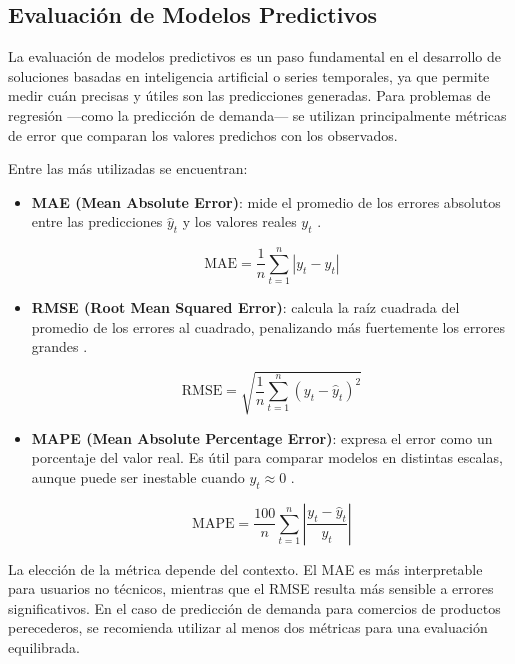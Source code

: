 \subsection{Evaluación de Modelos Predictivos}

La evaluación de modelos predictivos es un paso fundamental en el desarrollo de soluciones basadas en inteligencia artificial o series temporales, ya que permite medir cuán precisas y útiles son las predicciones generadas. Para problemas de regresión —como la predicción de demanda— se utilizan principalmente métricas de error que comparan los valores predichos con los observados.

Entre las más utilizadas se encuentran:

\begin{itemize}
    \item \textbf{MAE (Mean Absolute Error)}: mide el promedio de los errores absolutos entre las predicciones $\hat{y}_t$ y los valores reales $y_t$ \parencite{willmott2005}.
    
    \[
        \text{MAE} = \frac{1}{n} \sum_{t=1}^{n} \left| y_t - \hat{y}_t \right|
    \]

    \item \textbf{RMSE (Root Mean Squared Error)}: calcula la raíz cuadrada del promedio de los errores al cuadrado, penalizando más fuertemente los errores grandes \parencite{chai2014}.
    
    \[
        \text{RMSE} = \sqrt{ \frac{1}{n} \sum_{t=1}^{n} \left( y_t - \hat{y}_t \right)^2 }
    \]

    \item \textbf{MAPE (Mean Absolute Percentage Error)}: expresa el error como un porcentaje del valor real. Es útil para comparar modelos en distintas escalas, aunque puede ser inestable cuando $y_t \approx 0$ \parencite{myttenaere2016}.
    
    \[
        \text{MAPE} = \frac{100}{n} \sum_{t=1}^{n} \left| \frac{y_t - \hat{y}_t}{y_t} \right|
    \]
\end{itemize}

La elección de la métrica depende del contexto. El MAE es más interpretable para usuarios no técnicos, mientras que el RMSE resulta más sensible a errores significativos. En el caso de predicción de demanda para comercios de productos perecederos, se recomienda utilizar al menos dos métricas para una evaluación equilibrada.

